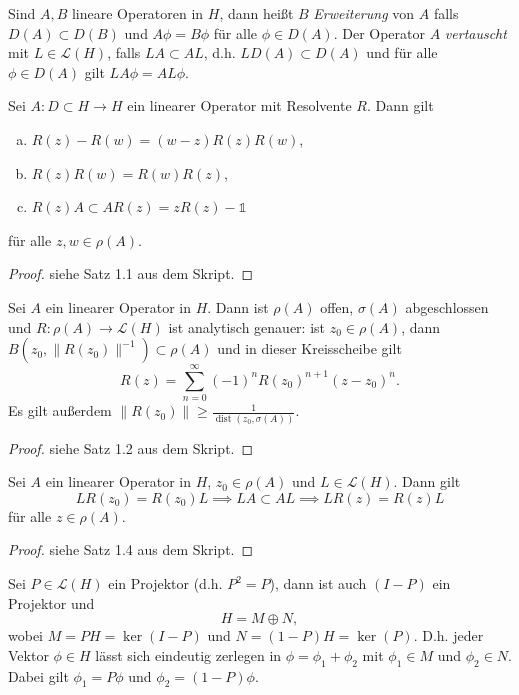 \documentclass{mycourse}
\newcommand{\dist}{\operatorname{dist}}
\begin{document}
Sind $A,B$ lineare Operatoren in $H$, dann heißt $B$ \emph{Erweiterung} von $A$ falls $D(A) \subset D(B)$ und $A\phi=B\phi$ für alle $\phi \in D(A)$. Der Operator $A$ \emph{vertauscht} mit $L\in \mathcal L(H)$, falls $LA\subset AL$, d.h. $LD(A)\subset D(A)$ und für alle $\phi \in D(A)$ gilt $LA\phi=AL\phi$.
\begin{st}\label{1.1}
Sei $A: D \subset H\to H$ ein linearer Operator mit Resolvente $R$. Dann gilt
\begin{enumerate}[a)]
\item $R(z)-R(w)=(w-z) R(z) R(w)$,
\item $R(z) R(w)=R(w) R(z)$,
\item $R(z) A\subset A R(z)=zR(z)-\mathbb{1}$
\end{enumerate}
für alle $z,w\in \rho(A)$.
\end{st}
\begin{proof}
siehe Satz 1.1 aus dem Skript.
\end{proof}
\begin{st} \label{1.2} Sei $A$ ein linearer Operator in $H$. Dann ist $\rho(A)$ offen, $\sigma(A)$ abgeschlossen und $R: \rho(A) \to \mathcal L(H)$ ist analytisch genauer: ist $z_0\in \rho(A)$, dann $B(z_0, \| R(z_0)\|^{-1}) \subset \rho(A)$ und in dieser Kreisscheibe gilt
\[
R(z)=\sum_{n=0}^\infty (-1)^n R(z_0)^{n+1} (z-z_0)^n.
\]
Es gilt außerdem $\|R(z_0)\|\ge \frac{1}{\dist(z_0, \sigma(A))}$.
\end{st}
\begin{proof}
siehe Satz 1.2 aus dem Skript.
\end{proof}
\begin{st}
Sei $A$ ein linearer Operator in $H$, $z_0\in \rho(A)$ und $L\in \mathcal L(H)$. Dann gilt 
\[
LR(z_0)=R(z_0)L \implies LA \subset AL \implies LR(z)=R(z)L
\]
für alle $z\in \rho(A)$.
\end{st}
\begin{proof}
siehe Satz 1.4 aus dem Skript.
\end{proof}

Sei $P\in \mathcal L(H)$ ein Projektor (d.h. $P^2=P$), dann ist auch $(I-P)$ ein Projektor und 
\[
H=M \oplus N,
\]
wobei $M=PH=\ker(I-P)$ und $N=(1-P)H=\ker(P)$. D.h. jeder Vektor $\phi\in H$ lässt sich eindeutig zerlegen in $\phi=\phi_1+\phi_2$ mit $\phi_1\in M$ und $\phi_2\in N$. Dabei gilt $\phi_1=P\phi$ und $\phi_2=(1-P)\phi$.
\end{document}
